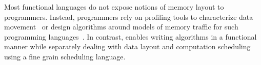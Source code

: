 Most functional languages do not expose notions of memory layout to programmers.  Instead, programmers rely on profiling tools to characterize data movement~\cite{Spoonhower:2008:SPP:1411203.1411240} or design algorithms around models of memory traffic for such programming languages~\cite{Blelloch:2013:CIE:2429069.2429077}.  In contrast, \framework{} enables writing algorithms in a functional manner while separately dealing with data layout and computation scheduling using a fine grain scheduling language.






